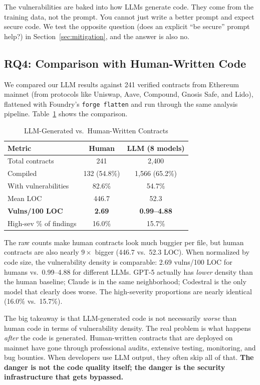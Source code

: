 \documentclass[11pt]{article}
\begin{document}
The vulnerabilities are baked into how LLMs generate code. They come from the training data, not the prompt. You cannot just write a better prompt and expect secure code. We test the opposite question (does an explicit ``be secure'' prompt help?) in Section~\ref{sec:mitigation}, and the answer is also no.

\subsection{RQ4: Comparison with Human-Written Code}

We compared our LLM results against 241 verified contracts from Ethereum mainnet (from protocols like Uniswap, Aave, Compound, Gnosis Safe, and Lido), flattened with Foundry's \texttt{forge flatten} and run through the same analysis pipeline. Table~\ref{tab:human} shows the comparison.

\begin{table}[H]
\centering
\caption{LLM-Generated vs.\ Human-Written Contracts}
\label{tab:human}
\begin{tabular}{@{}lcc@{}}
\toprule
\textbf{Metric} & \textbf{Human} & \textbf{LLM (8 models)} \\
\midrule
Total contracts & 241 & 2,400 \\
Compiled & 132 (54.8\%) & 1,566 (65.2\%) \\
With vulnerabilities & 82.6\% & 54.7\% \\
Mean LOC & 446.7 & 52.3 \\
\textbf{Vulns/100 LOC} & \textbf{2.69} & \textbf{0.99--4.88} \\
High-sev \% of findings & 16.0\% & 15.7\% \\
\bottomrule
\end{tabular}
\end{table}

The raw counts make human contracts look much buggier per file, but human contracts are also nearly $9\times$ bigger (446.7 vs.\ 52.3 LOC). When normalized by code size, the vulnerability density is comparable: 2.69 vulns/100 LOC for humans vs.\ 0.99--4.88 for different LLMs. GPT-5 actually has \emph{lower} density than the human baseline; Claude is in the same neighborhood; Codestral is the only model that clearly does worse. The high-severity proportions are nearly identical (16.0\% vs.\ 15.7\%).

The big takeaway is that LLM-generated code is not necessarily \emph{worse} than human code in terms of vulnerability density. The real problem is what happens \emph{after} the code is generated. Human-written contracts that are deployed on mainnet have gone through professional audits, extensive testing, monitoring, and bug bounties. When developers use LLM output, they often skip all of that. \textbf{The danger is not the code quality itself; the danger is the security infrastructure that gets bypassed.}
\end{document}
